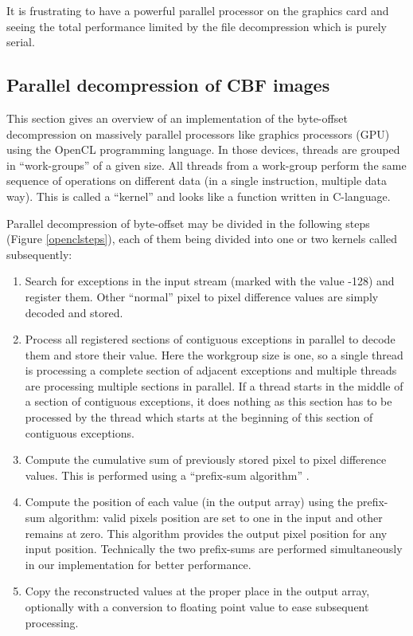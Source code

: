 \documentclass[preprint]{iucr}              %
\begin{document}
It is frustrating to have a powerful parallel processor on the
graphics card and seeing the total performance limited by the file decompression
which is purely serial. 

\subsection{Parallel decompression of CBF images}
 
This section gives an overview of an implementation of the byte-offset
decompression on massively parallel processors like graphics processors
(GPU) using the OpenCL \cite{opencl} programming language.
In those devices, threads are grouped in ``work-groups'' of a given size.
All threads from a work-group perform the same sequence of operations on
different data (in a single instruction, multiple data way).
This is called a ``kernel'' and looks like a function written in C-language.

Parallel decompression of byte-offset may be divided in the following steps (Figure \ref{openclsteps}),
each of them being divided into one or two kernels called subsequently:
\begin{enumerate}
  \item Search for exceptions in the input stream (marked with the value -128)
  and register them. Other ``normal'' pixel to pixel difference values are simply decoded and stored.
  \item Process all registered sections of contiguous exceptions in parallel to decode them and store their value.
  Here the workgroup size is one, so a single thread is processing a complete
  section of adjacent exceptions and multiple threads are processing multiple
  sections in parallel.
  If a thread starts in the middle of a section of contiguous exceptions,
  it does nothing as this section has to be processed by the thread
  which starts at the beginning of this section of contiguous exceptions.
  \item Compute the cumulative sum of previously stored pixel to pixel difference values.
  This is performed using a ``prefix-sum algorithm'' \cite{scan}.
  \item Compute the position of each value (in the output array)
  using the prefix-sum algorithm: valid pixels position are set to one in the
  input and other remains at zero. This algorithm provides the output pixel
  position for any input position.
  Technically the two prefix-sums are performed simultaneously in our
  implementation for better performance.
  \item Copy the reconstructed values at the proper place in
  the output array, optionally with a conversion to floating point value to
  ease subsequent processing.
\end{enumerate}
\end{document}
